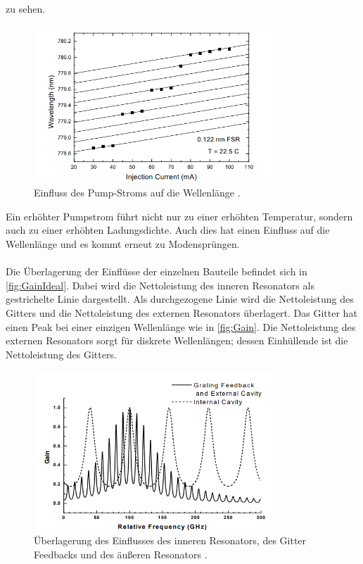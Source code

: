 zu sehen.
\begin{figure}
    \centering
    \includegraphics[width=0.8\textwidth]{ModeCurr.png}
    \caption{Einfluss des Pump-Stroms auf die Wellenlänge \cite{ap60}.}
    \label{fig:Curr}
\end{figure}
Ein erhöhter Pumpstrom führt nicht nur zu einer erhöhten Temperatur, sondern auch zu einer erhöhten 
Ladungsdichte. Auch dies hat einen Einfluss auf die Wellenlänge und es kommt erneut zu Modensprüngen.
\\
\\
Die Überlagerung der Einflüsse der einzelnen Bauteile befindet sich in \autoref{fig:GainIdeal}. 
Dabei wird die Nettoleistung des inneren Resonators als gestrichelte Linie dargestellt. Als durchgezogene 
Linie wird die Nettoleistung des Gitters und die Nettoleistung des externen Resonators überlagert. 
Das Gitter hat einen Peak bei einer einzigen Wellenlänge wie in \autoref{fig:Gain}. Die Nettoleistung des externen
Resonators sorgt für diskrete Wellenlängen; dessen Einhüllende ist die Nettoleistung des Gitters.
\begin{figure}
    \centering
    \includegraphics[width=0.8\textwidth]{CavityIdeal.png}
    \caption{Überlagerung des Einflusses des inneren Resonators, des Gitter Feedbacks und des äußeren Resonators \cite{ap60}.}
    \label{fig:GainIdeal}
\end{figure}

